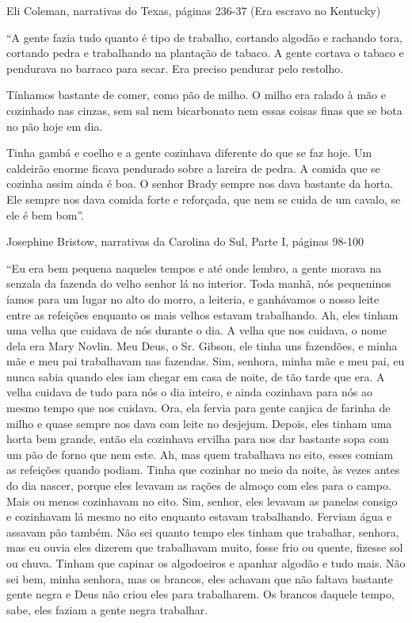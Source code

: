 Eli Coleman, narrativas do Texas, páginas 236-37 (Era escravo no
Kentucky)

``A gente fazia tudo quanto é tipo de trabalho, cortando algodão e
rachando tora, cortando pedra e trabalhando na plantação de tabaco. A
gente cortava o tabaco e pendurava no barraco para secar. Era preciso
pendurar pelo restolho.

Tínhamos bastante de comer, como pão de milho. O milho era ralado à mão
e cozinhado nas cinzas, sem sal nem bicarbonato nem essas coisas finas
que se bota no pão hoje em dia.

Tinha gambá e coelho e a gente cozinhava diferente do que se faz hoje.
Um caldeirão enorme ficava pendurado sobre a lareira de pedra. A comida
que se cozinha assim ainda é boa. O senhor Brady sempre nos dava
bastante da horta. Ele sempre nos dava comida forte e reforçada, que nem
se cuida de um cavalo, se ele é bem bom''.

Josephine Bristow, narrativas da Carolina do Sul, Parte I, páginas
98-100

``Eu era bem pequena naqueles tempos e até onde lembro, a gente morava
na senzala da fazenda do velho senhor lá no interior. Toda manhã, nós
pequeninos íamos para um lugar no alto do morro, a leiteria, e
ganhávamos o nosso leite entre as refeições enquanto os mais velhos
estavam trabalhando. Ah, eles tinham uma velha que cuidava de nós
durante o dia. A velha que nos cuidava, o nome dela era Mary Novlin. Meu
Deus, o Sr. Gibson, ele tinha uns fazendões, e minha mãe e meu pai
trabalhavam nas fazendas. Sim, senhora, minha mãe e meu pai, eu nunca
sabia quando eles iam chegar em casa de noite, de tão tarde que era. A
velha cuidava de tudo para nós o dia inteiro, e ainda cozinhava para nós
ao mesmo tempo que nos cuidava. Ora, ela fervia para gente canjica de
farinha de milho e quase sempre nos dava com leite no desjejum. Depois,
eles tinham uma horta bem grande, então ela cozinhava ervilha para nos
dar bastante sopa com um pão de forno que nem este. Ah, mas quem
trabalhava no eito, esses comiam as refeições quando podiam. Tinha que
cozinhar no meio da noite, às vezes antes do dia nascer, porque eles
levavam as rações de almoço com eles para o campo. Mais ou menos
cozinhavam no eito. Sim, senhor, eles levavam as panelas consigo e
cozinhavam lá mesmo no eito enquanto estavam trabalhando. Ferviam água e
assavam pão também. Não sei quanto tempo eles tinham que trabalhar,
senhora, mas eu ouvia eles dizerem que trabalhavam muito, fosse frio ou
quente, fizesse sol ou chuva. Tinham que capinar os algodoeiros e
apanhar algodão e tudo mais. Não sei bem, minha senhora, mas os brancos,
eles achavam que não faltava bastante gente negra e Deus não criou eles
para trabalharem. Os brancos daquele tempo, sabe, eles faziam a gente
negra trabalhar.

